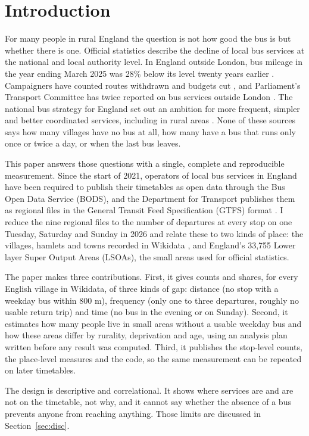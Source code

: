 \documentclass[11pt,a4paper]{article}
\begin{document}
\section{Introduction}\label{sec:intro}
For many people in rural England the question is not how good the bus is but whether there is one. Official statistics describe the decline of local bus services at the national and local authority level. In England outside London, bus mileage in the year ending March 2025 was 28\% below its level twenty years earlier \citep{dft2025}. Campaigners have counted routes withdrawn and budgets cut \citep{cbt2013,cbt2018}, and Parliament's Transport Committee has twice reported on bus services outside London \citep{tc2019,tc2023}. The national bus strategy for England set out an ambition for more frequent, simpler and better coordinated services, including in rural areas \citep{dft2021}. None of these sources says how many villages have no bus at all, how many have a bus that runs only once or twice a day, or when the last bus leaves.

This paper answers those questions with a single, complete and reproducible measurement. Since the start of 2021, operators of local bus services in England have been required to publish their timetables as open data through the Bus Open Data Service (BODS), and the Department for Transport publishes them as regional files in the General Transit Feed Specification (GTFS) format \citep{bods2026}. I reduce the nine regional files to the number of departures at every stop on one Tuesday, Saturday and Sunday in 2026 and relate these to two kinds of place: the villages, hamlets and towns recorded in Wikidata \citep{vrandecic2014}, and England's 33,755 Lower layer Super Output Areas (LSOAs), the small areas used for official statistics.

The paper makes three contributions. First, it gives counts and shares, for every English village in Wikidata, of three kinds of gap: distance (no stop with a weekday bus within 800 m), frequency (only one to three departures, roughly no usable return trip) and time (no bus in the evening or on Sunday). Second, it estimates how many people live in small areas without a usable weekday bus and how these areas differ by rurality, deprivation and age, using an analysis plan written before any result was computed. Third, it publishes the stop-level counts, the place-level measures and the code, so the same measurement can be repeated on later timetables.

The design is descriptive and correlational. It shows where services are and are not on the timetable, not why, and it cannot say whether the absence of a bus prevents anyone from reaching anything. Those limits are discussed in Section~\ref{sec:disc}.
\end{document}
